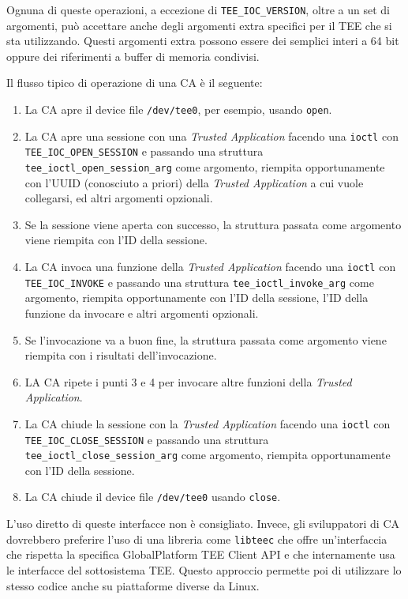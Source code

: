 \documentclass[12pt,italian]{report}
\begin{document}
Ognuna di queste operazioni, a eccezione di \texttt{TEE\_IOC\_VERSION},
oltre a un set di argomenti, può accettare anche degli argomenti extra
specifici per il TEE che si sta utilizzando.
Questi argomenti extra possono essere dei semplici interi a 64 bit oppure
dei riferimenti a buffer di memoria condivisi.

Il flusso tipico di operazione di una CA è il seguente:
\begin{enumerate}
    \item La CA apre il device file \texttt{/dev/tee0}, per esempio, usando
        \texttt{open}.
    \item La CA apre una sessione con una \textit{Trusted Application}
        facendo una \texttt{ioctl} con \texttt{TEE\_IOC\_OPEN\_SESSION}
        e passando una struttura \texttt{tee\_ioctl\_open\_session\_arg}
        come argomento, riempita opportunamente con l'UUID
        (conosciuto a priori) 
        della \textit{Trusted Application} a cui vuole collegarsi, 
        ed altri argomenti opzionali.
    \item Se la sessione viene aperta con successo, la struttura passata come
        argomento viene riempita con l'ID della sessione.
    \item La CA invoca una funzione della \textit{Trusted Application} facendo
        una \texttt{ioctl} con \texttt{TEE\_IOC\_INVOKE} e passando una
        struttura \texttt{tee\_ioctl\_invoke\_arg} come argomento, riempita
        opportunamente con l'ID della sessione, l'ID della funzione da
        invocare e altri argomenti opzionali.
    \item Se l'invocazione va a buon fine, la struttura passata come argomento
        viene riempita con i risultati dell'invocazione.
    \item LA CA ripete i punti 3 e 4 per invocare altre funzioni della
        \textit{Trusted Application}.
    \item La CA chiude la sessione con la \textit{Trusted Application} facendo
        una \texttt{ioctl} con \texttt{TEE\_IOC\_CLOSE\_SESSION} e passando
        una struttura \texttt{tee\_ioctl\_close\_session\_arg} come argomento,
        riempita opportunamente con l'ID della sessione.
    \item La CA chiude il device file \texttt{/dev/tee0} usando \texttt{close}.
\end{enumerate}

\bigbreak \noindent

L'uso diretto di queste interfacce non è consigliato.
Invece, gli sviluppatori di CA dovrebbero preferire l'uso di una libreria come
\texttt{libteec} che offre un'interfaccia che rispetta la specifica
GlobalPlatform TEE Client API\cite{globalplatform_tee_client_api} 
e che internamente usa
le interfacce del sottosistema TEE.
Questo approccio permette poi di utilizzare lo stesso codice anche su
piattaforme diverse da Linux.
\end{document}
